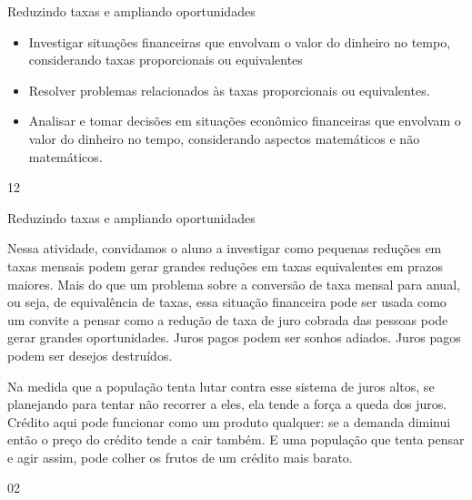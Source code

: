 \marginpar{\vspace{-2.5em}}
\begin{objectives}{Reduzindo taxas e ampliando oportunidades}
{
\begin{itemize}
\item Investigar situações financeiras que envolvam o valor do dinheiro no tempo, considerando taxas proporcionais ou equivalentes
\item Resolver problemas relacionados às taxas proporcionais ou equivalentes.
\item Analisar e tomar decisões em situações econômico financeiras que envolvam o valor do dinheiro no tempo, considerando aspectos matemáticos e não matemáticos.
\end{itemize}
}{1}{2}
\end{objectives}
\begin{sugestions}{Reduzindo taxas e ampliando oportunidades}
{
Nessa atividade, convidamos o aluno a investigar como pequenas reduções em taxas mensais podem gerar grandes reduções em taxas equivalentes em prazos maiores. Mais do que um problema sobre a conversão de taxa mensal para anual, ou seja, de equivalência de taxas, essa situação financeira pode ser usada como um convite a pensar como a redução de taxa de juro cobrada das pessoas pode gerar grandes oportunidades. Juros pagos podem ser sonhos adiados. Juros pagos podem ser desejos destruídos.

Na medida que a população tenta lutar contra esse sistema de juros altos, se planejando para tentar não recorrer a eles, ela tende a força a queda dos juros. Crédito aqui pode funcionar como um produto qualquer: se a demanda diminui então o preço do crédito tende a cair também. E uma população que tenta pensar e agir assim, pode colher os frutos de um crédito mais barato.
\columnbreak
}{0}{2}
\end{sugestions}
